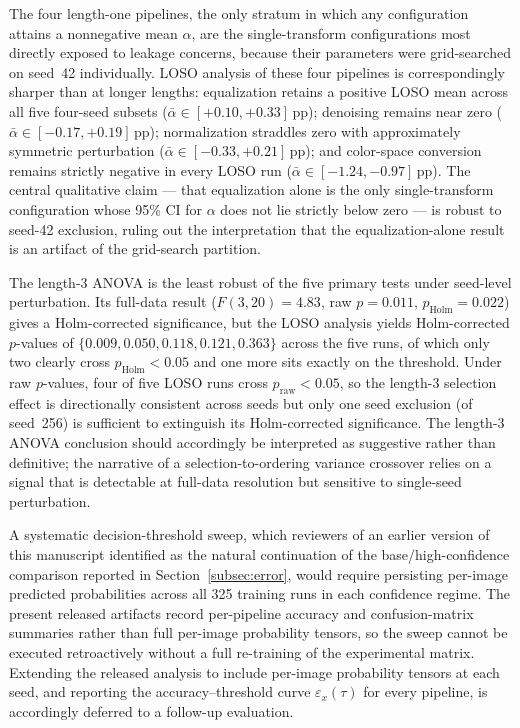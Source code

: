 \documentclass[preprint,5p,times,twocolumn]{elsarticle}
\begin{document}
The four length-one pipelines, the only stratum in which any configuration attains a nonnegative mean $\alpha$, are the single-transform configurations most directly exposed to leakage concerns, because their parameters were grid-searched on seed~42 individually. LOSO analysis of these four pipelines is correspondingly sharper than at longer lengths: equalization retains a positive LOSO mean across all five four-seed subsets ($\bar\alpha \in [+0.10, +0.33]$\,pp); denoising remains near zero ($\bar\alpha \in [-0.17, +0.19]$\,pp); normalization straddles zero with approximately symmetric perturbation ($\bar\alpha \in [-0.33, +0.21]$\,pp); and color-space conversion remains strictly negative in every LOSO run ($\bar\alpha \in [-1.24, -0.97]$\,pp). The central qualitative claim --- that equalization alone is the only single-transform configuration whose 95\% CI for $\alpha$ does not lie strictly below zero --- is robust to seed-42 exclusion, ruling out the interpretation that the equalization-alone result is an artifact of the grid-search partition.

The length-3 ANOVA is the least robust of the five primary tests under seed-level perturbation. Its full-data result ($F(3,20) = 4.83$, raw $p = 0.011$, $p_{\text{Holm}} = 0.022$) gives a Holm-corrected significance, but the LOSO analysis yields Holm-corrected $p$-values of $\{0.009, 0.050, 0.118, 0.121, 0.363\}$ across the five runs, of which only two clearly cross $p_{\text{Holm}} < 0.05$ and one more sits exactly on the threshold. Under raw $p$-values, four of five LOSO runs cross $p_{\text{raw}} < 0.05$, so the length-3 selection effect is directionally consistent across seeds but only one seed exclusion (of seed~256) is sufficient to extinguish its Holm-corrected significance. The length-3 ANOVA conclusion should accordingly be interpreted as suggestive rather than definitive; the narrative of a selection-to-ordering variance crossover relies on a signal that is detectable at full-data resolution but sensitive to single-seed perturbation.

A systematic decision-threshold sweep, which reviewers of an earlier version of this manuscript identified as the natural continuation of the base/high-confidence comparison reported in Section~\ref{subsec:error}, would require persisting per-image predicted probabilities across all 325 training runs in each confidence regime. The present released artifacts record per-pipeline accuracy and confusion-matrix summaries rather than full per-image probability tensors, so the sweep cannot be executed retroactively without a full re-training of the experimental matrix. Extending the released analysis to include per-image probability tensors at each seed, and reporting the accuracy--threshold curve $\varepsilon_x(\tau)$ for every pipeline, is accordingly deferred to a follow-up evaluation.
\end{document}
